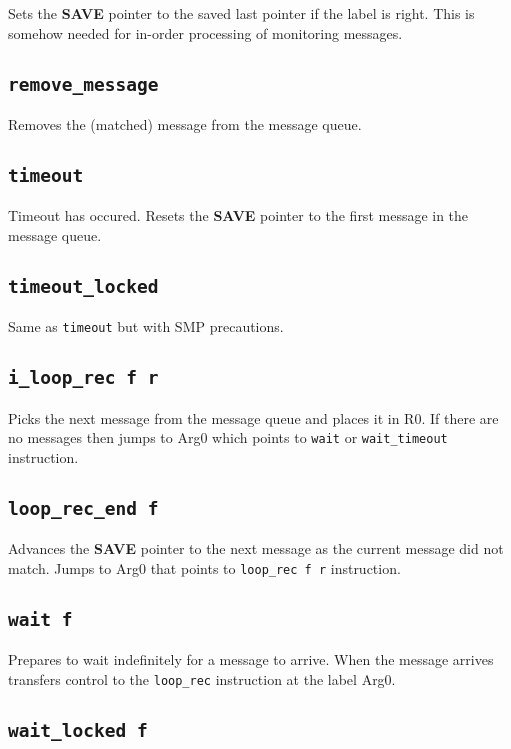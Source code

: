 \documentclass{article}
\newcommand{\save}{\textbf{SAVE}}
\newcommand{\iop}[1]{\texttt{#1}}
\begin{document}
Sets the \save{} pointer to the saved last pointer if the label is right. This
is somehow needed for in-order processing of monitoring messages.

\subsection*{\iop{remove\_message}}

Removes the (matched) message from the message queue.

\subsection*{\iop{timeout}}

Timeout has occured. Resets the \save{} pointer to the first message in the
message queue.

\subsection*{\iop{timeout\_locked}}

Same as \iop{timeout} but with SMP precautions.

\subsection*{\iop{i\_loop\_rec f r}}

Picks the next message from the message queue and places it in R0. If there are
no messages then jumps to Arg0 which points to \iop{wait} or \iop{wait\_timeout}
instruction.

\subsection*{\iop{loop\_rec\_end f}}

Advances the \save{} pointer to the next message as the current message did not
match. Jumps to Arg0 that points to \iop{loop\_rec f r} instruction.

\subsection*{\iop{wait f}}

Prepares to wait indefinitely for a message to arrive. When the message arrives
transfers control to the \iop{loop\_rec} instruction at the label Arg0.

\subsection*{\iop{wait\_locked f}}
\end{document}
